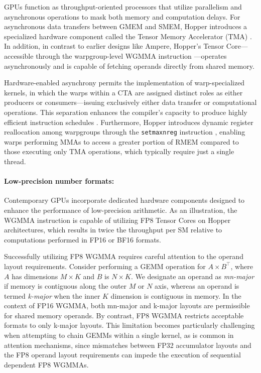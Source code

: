 GPUs function as throughput-oriented processors that utilize parallelism and asynchronous operations to mask both memory and computation delays. For asynchronous data transfers between GMEM and SMEM, Hopper introduces a specialized hardware component called the Tensor Memory Accelerator (TMA) \cite[\S7.29]{cuda}. In addition, in contrast to earlier designs like Ampere, Hopper’s Tensor Core—accessible through the warpgroup-level WGMMA instruction \cite[\S9.7.14]{ptx}—operates asynchronously and is capable of fetching operands directly from shared memory.

Hardware-enabled asynchrony permits the implementation of warp-specialized kernels, in which the warps within a CTA are assigned distinct roles as either producers or consumers—issuing exclusively either data transfer or computational operations. This separation enhances the compiler's capacity to produce highly efficient instruction schedules \citep{warp-specialization-2011}. Furthermore, Hopper introduces dynamic register reallocation among warpgroups through the \verb|setmaxnreg| instruction \cite[\S9.7.17.1]{ptx}, enabling warps performing MMAs to access a greater portion of RMEM compared to those executing only TMA operations, which typically require just a single thread.

\paragraph{Low-precision number formats:}
\label{sec:low-precision-gpu}
Contemporary GPUs incorporate dedicated hardware components designed to enhance the performance of low-precision arithmetic. As an illustration, the WGMMA instruction is capable of utilizing FP8 Tensor Cores on Hopper architectures, which results in twice the throughput per SM relative to computations performed in FP16 or BF16 formats.

Successfully utilizing FP8 WGMMA requires careful attention to the operand layout requirements. Consider performing a GEMM operation for $A \times B^{\top}$, where $A$ has dimensions $M \times K$ and $B$ is $N \times K$. We designate an operand as \emph{mn-major} if memory is contiguous along the outer $M$ or $N$ axis, whereas an operand is termed \emph{k-major} when the inner $K$ dimension is contiguous in memory. In the context of FP16 WGMMA, both mn-major and k-major layouts are permissible for shared memory operands. By contrast, FP8 WGMMA restricts acceptable formats to only k-major layouts. This limitation becomes particularly challenging when attempting to chain GEMMs within a single kernel, as is common in attention mechanisms, since mismatches between FP32 accumulator layouts and the FP8 operand layout requirements can impede the execution of sequential dependent FP8 WGMMAs.

